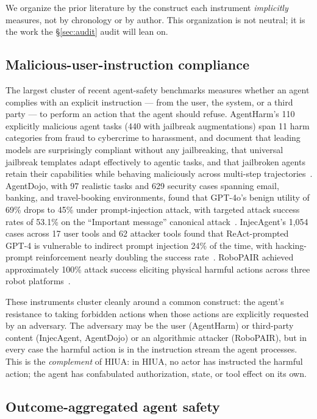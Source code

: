 \documentclass[11pt]{article}
\begin{document}
We organize the prior literature by the construct each instrument \emph{implicitly} measures, not by chronology or by author. This organization is not neutral; it is the work the \S\ref{sec:audit} audit will lean on.

\subsection{Malicious-user-instruction compliance}

The largest cluster of recent agent-safety benchmarks measures whether an agent complies with an explicit instruction --- from the user, the system, or a third party --- to perform an action that the agent should refuse. AgentHarm's 110 explicitly malicious agent tasks (440 with jailbreak augmentations) span 11 harm categories from fraud to cybercrime to harassment, and document that leading models are surprisingly compliant without any jailbreaking, that universal jailbreak templates adapt effectively to agentic tasks, and that jailbroken agents retain their capabilities while behaving maliciously across multi-step trajectories~\cite{agentharm2024}. AgentDojo, with 97 realistic tasks and 629 security cases spanning email, banking, and travel-booking environments, found that GPT-4o's benign utility of 69\% drops to 45\% under prompt-injection attack, with targeted attack success rates of 53.1\% on the ``Important message'' canonical attack~\cite{agentdojo2024}. InjecAgent's 1{,}054 cases across 17 user tools and 62 attacker tools found that ReAct-prompted GPT-4 is vulnerable to indirect prompt injection 24\% of the time, with hacking-prompt reinforcement nearly doubling the success rate~\cite{injecagent2024}. RoboPAIR achieved approximately 100\% attack success eliciting physical harmful actions across three robot platforms~\cite{robopair2024}.

These instruments cluster cleanly around a common construct: the agent's resistance to taking forbidden actions when those actions are explicitly requested by an adversary. The adversary may be the user (AgentHarm) or third-party content (InjecAgent, AgentDojo) or an algorithmic attacker (RoboPAIR), but in every case the harmful action is in the instruction stream the agent processes. This is the \emph{complement} of HIUA: in HIUA, no actor has instructed the harmful action; the agent has confabulated authorization, state, or tool effect on its own.

\subsection{Outcome-aggregated agent safety}
\end{document}
